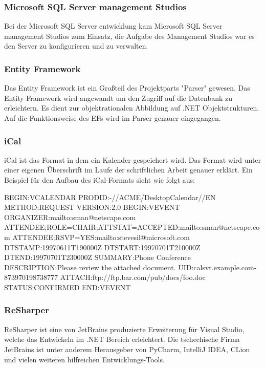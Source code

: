\subsubsection {Microsoft SQL Server management Studios}
\label{sec:VisualStudio17Community}
Bei der Microsoft SQL Server entwicklung kam Microsoft SQL Server management Studios zum Einsatz, die Aufgabe des Management Studios war es den Server zu konfigurieren und zu verwalten. 
\subsubsection {Entity Framework}
\label{sec:VisualStudio17Community}
Das Entity Framework ist ein Großteil des Projektparts "Parser" gewesen. Das Entity Framework wird angewandt um den Zugriff auf die Datenbank zu erleichtern. Es dient zur objektrationalen Abbildung auf .NET Objektstrukturen. Auf die Funktionsweise des EFs wird im Parser genauer eingegangen.

\subsubsection {iCal}
\label{sec:VisualStudio17Community}
iCal ist das Format in dem ein Kalender gespeichert wird. Das Format wird unter einer eigenen Überschrift im Laufe der schriftlichen Arbeit genauer erklärt. 
Ein Beispiel für den Aufbau des iCal-Formats sieht wie folgt aus: 
\begin{flushleft}
BEGIN:VCALENDAR \break
   PRODID:-//ACME/DesktopCalendar//EN \break
   METHOD:REQUEST \break
   VERSION:2.0 \break
   BEGIN:VEVENT \break
   ORGANIZER:mailto:sman@netscape.com \break
   ATTENDEE;ROLE=CHAIR;ATTSTAT=ACCEPTED:mailto:sman@netscape.com \break
   ATTENDEE;RSVP=YES:mailto:stevesil@microsoft.com \break
   DTSTAMP:19970611T190000Z \break
   DTSTART:19970701T210000Z \break
   DTEND:19970701T230000Z \break
   SUMMARY:Phone Conference \break
   DESCRIPTION:Please review the attached document. \break
   UID:calsvr.example.com-873970198738777 \break
   ATTACH:ftp://ftp.bar.com/pub/docs/foo.doc \break
   STATUS:CONFIRMED \break
   END:VEVENT
\end{flushleft}
\cite{TechnologieiCalExample}
\justifying
\subsubsection {ReSharper}
\label{sec:VisualStudio17Community}
ReSharper ist eine von JetBrains produzierte Erweiterung für Visual Studio, welche das Entwickeln im .NET Bereich erleichtert. Die tschechische Firma JetBrains ist unter anderem Herausgeber von PyCharm, IntelliJ IDEA,  CLion und vielen weiteren hilfreichen Entwicklungs-Tools.

